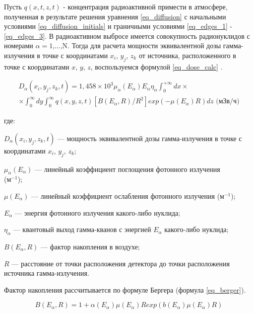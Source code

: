 Пусть $q(x,t,z,t)$ - концентрация радиоактивной примести в атмосфере, полученная в результате решения уравнения
\ref{eq_diffusion} с начальными условиями \ref{eq_diffusion_initials} и граничными условиями \ref{eq_edges_1} -
\ref{eq_edges_3}. В радиоактивном выбросе имеется совокупность радионуклидов с номерами $\alpha = 1\text{,...,N}$.
Тогда для расчета мощности эквивалентной дозы гамма-излучения в точке с координатами $x_i$, $y_j$, $z_k$ от источника, 
расположенного в точке с координатами $x$, $y$, $z$, воспользуемся формулой \ref{eq_dose_calc} \cite{elokhin}.

\begin{equation}
    \begin{aligned}
        \label{eq_dose_calc}
        D_{\alpha}(x_i, y_j, z_k, t) = 1,458 \times 10^{3} \mu_{\alpha}(E_{\alpha}) E_{\alpha} \eta_{\alpha} \int_{0}^{+\infty}
            dx \times \\ \times \int_{0}^{\infty} dy \int_{0}^{\infty} q(x, y, z, t) [B(E_{\alpha}, R) / R^{2}] exp(-\mu(E_{\alpha})
            R) dz \text{ (мЗв/ч)}
    \end{aligned}
\end{equation}

где:
\begin{description}
    \item $D_{\alpha}(x_i, y_j, z_k, t)$ --- мощность эквивалентной дозы гамма-излучения в точке с координатами $x_i$,
        $y_j$, $z_k$;
    \item $\mu_{\alpha}(E_{\alpha})$ --- линейный коэффициент поглощения фотонного излучения \\ (м$^{-1}$);
    \item $\mu(E_{\alpha})$ --- линейный коэффициент ослабления фотонного излучения (м$^{-1}$);
    \item $E_{\alpha}$ --- энергия фотонного излучения какого-либо нуклида;
    \item $\eta_{\alpha}$ --- квантовый выход гамма-кванов с энергией $E_{\alpha}$ какого-либо нуклида;
    \item $B(E_{\alpha}, R)$ --- фактор накопления в воздухе;
    \item $R$ --- расстояние от точки расположения детектора до точки расположения источника гамма-излучения.
\end{description}

Фактор накопления рассчитывается по формуле Бергера \cite{mashkovich} (формула \ref{eq_berger}).

\begin{equation}
    \label{eq_berger}
    B(E_{\alpha}, R) = 1 + \alpha(E_{\alpha}) \mu(E_{\alpha}) R exp(b(E_{\alpha}) \mu(E_{\alpha}) R)
\end{equation}

